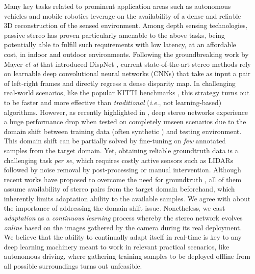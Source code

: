 \documentclass[10pt,twocolumn,letterpaper]{article}
\def\ie{\emph{i.e.}}
\def\etal{\emph{et al}}
\def\kitti{KITTI}
\begin{document}
Many key tasks related to prominent application areas such as autonomous vehicles and mobile robotics leverage on the availability of a dense and reliable 3D reconstruction of the sensed environment. Among depth sensing technologies, passive stereo has proven particularly amenable to the above tasks, being potentially able to fulfill such requirements with low latency, at an affordable cost, in indoor and outdoor environments.
Following the groundbreaking work by Mayer \etal{} that introduced DispNet \cite{mayer2016large}, current state-of-the-art stereo methods rely on learnable deep convolutional neural networks (CNNs) that take as input a pair of left-right frames and directly regress a dense disparity map. In challenging real-world scenarios, like the popular \kitti{} benchmarks \cite{KITTI_2012,KITTI_2015}, this strategy turns out to be faster and more effective than \emph{traditional} (\ie, not learning-based) algorithms. However, as recently highlighted in \cite{Tonioni_2017_ICCV,pang2018zoom}, deep stereo networks experience a huge performance drop when tested on completely unseen scenarios due to the domain shift between training data (often synthetic \cite{mayer2016large}) and testing environment. This domain shift can be partially solved by fine-tuning on \textit{few} annotated samples from the target domain. Yet, obtaining reliable groundtruth data is a challenging task \emph{per se},  which requires  costly active sensors such as LIDARs followed by noise removal by post-processing \cite{Uhrig2017THREEDV} or manual intervention. Although recent works have proposed to overcome the need for groundtruth \cite{Tonioni_2017_ICCV,pang2018zoom,zhou2017unsupervisedStereo,godard2017unsupervised,zhang2018activestereonet}, all of them assume availability of stereo pairs from the target domain beforehand, which inherently limits adaptation ability to the available samples.
We agree with \cite{Tonioni_2017_ICCV,pang2018zoom} about the importance of addressing the domain shift issue. Nonetheless, we cast \emph{adaptation} as a \emph{continuous learning} process whereby the stereo network evolves \emph{online}  based on the images gathered by the camera during its real deployment. We believe that the ability to continually adapt itself in real-time is key to any deep learning machinery meant to work in relevant practical scenarios, like autonomous driving, where gathering training samples to be deployed offline from all possible surroundings turns out unfeasible. 
\end{document}
